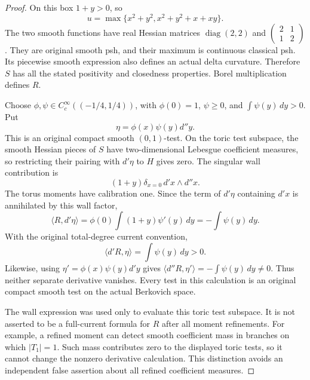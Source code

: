 \documentclass[11pt,a4paper]{article}
\numberwithin{equation}{section}
\theoremstyle{definition}
\theoremstyle{remark}
\begin{document}
\begin{proof}
On this box $1+y>0$, so
\[
 u=\max\{x^2+y^2, x^2+y^2+x+xy\}.
\]
The two smooth functions have real Hessian matrices
$\operatorname{diag}(2,2)$ and
$\left(\begin{smallmatrix}2&1\\1&2\end{smallmatrix}\right)$.
They are original smooth psh, and their maximum is continuous
classical psh. Its piecewise smooth expression also defines an
actual delta curvature. Therefore $S$ has all the stated positivity
and closedness properties. Borel multiplication defines $R$.

Choose $\phi,\psi\in C_c^\infty((-1/4,1/4))$, with
$\phi(0)=1$, $\psi\ge0$, and $\int\psi(y)\,dy>0$. Put
\[
                 \eta=\phi(x)\psi(y)d''y.
\]
This is an original compact smooth $(0,1)$-test. On the toric test
subspace, the smooth Hessian pieces of $S$ have two-dimensional
Lebesgue coefficient measures, so restricting their pairing with
$d'\eta$ to $H$ gives zero. The singular wall contribution is
\[
                    (1+y)\delta_{x=0}\,d'x\wedge d''x.
\]
The torus moments have calibration one. Since the term of
$d'\eta$ containing $d'x$ is annihilated by this wall factor,
\[
 \langle R,d'\eta\rangle
       =\phi(0)\int(1+y)\psi'(y)\,dy
       =-\int\psi(y)\,dy.
\]
With the original total-degree current convention,
\[
                \langle d'R,\eta\rangle
                       =\int\psi(y)\,dy>0.
\]
Likewise, using $\eta'=\phi(x)\psi(y)d'y$ gives
$\langle d''R,\eta'\rangle=-\int\psi(y)\,dy\ne0$.
Thus neither separate derivative vanishes. Every test in this
calculation is an original compact smooth test on the actual
Berkovich space.

The wall expression was used only to evaluate this toric test
subspace. It is not asserted to be a full-current formula for $R$
after all moment refinements. For example, a refined moment can
detect smooth coefficient mass in branches on which $|T_1|=1$.
Such mass contributes zero to the displayed toric tests, so it
cannot change the nonzero derivative calculation. This distinction
avoids an independent false assertion about all refined coefficient
measures.
\end{proof}
\end{document}
